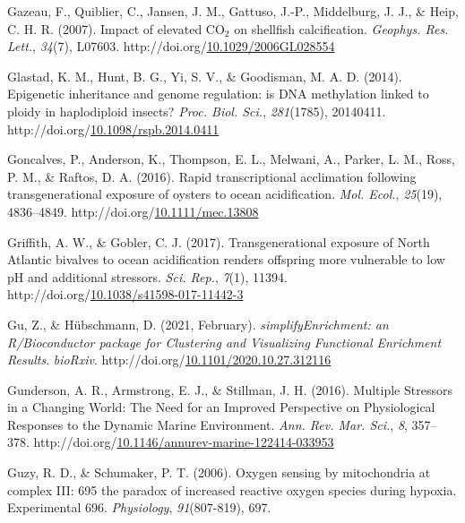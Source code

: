 \documentclass [11pt, proquest] {uwthesis}[2015/03/03]
\newlength{\cslhangindent}
\newenvironment{CSLReferences}%
{\setlength{\parindent}{0pt}%
\everypar{\setlength{\hangindent}{\cslhangindent}}\ignorespaces}%
{\par}
\begin{document}
\begin{CSLReferences}{1}{0}
\leavevmode\hypertarget{ref-Gazeau2007}{}%
Gazeau, F., Quiblier, C., Jansen, J. M., Gattuso, J.-P., Middelburg, J. J., \& Heip, C. H. R. (2007). {Impact of elevated {CO\(_2\)} on shellfish calcification}. \emph{Geophys. Res. Lett.}, \emph{34}(7), L07603. http://doi.org/\href{https://doi.org/10.1029/2006GL028554}{10.1029/2006GL028554}

\leavevmode\hypertarget{ref-Glastad2014}{}%
Glastad, K. M., Hunt, B. G., Yi, S. V., \& Goodisman, M. A. D. (2014). {Epigenetic inheritance and genome regulation: is DNA methylation linked to ploidy in haplodiploid insects?} \emph{Proc. Biol. Sci.}, \emph{281}(1785), 20140411. http://doi.org/\href{https://doi.org/10.1098/rspb.2014.0411}{10.1098/rspb.2014.0411}

\leavevmode\hypertarget{ref-Goncalves2016}{}%
Goncalves, P., Anderson, K., Thompson, E. L., Melwani, A., Parker, L. M., Ross, P. M., \& Raftos, D. A. (2016). {Rapid transcriptional acclimation following transgenerational exposure of oysters to ocean acidification}. \emph{Mol. Ecol.}, \emph{25}(19), 4836--4849. http://doi.org/\href{https://doi.org/10.1111/mec.13808}{10.1111/mec.13808}

\leavevmode\hypertarget{ref-Griffith2017}{}%
Griffith, A. W., \& Gobler, C. J. (2017). {Transgenerational exposure of North Atlantic bivalves to ocean acidification renders offspring more vulnerable to low pH and additional stressors}. \emph{Sci. Rep.}, \emph{7}(1), 11394. http://doi.org/\href{https://doi.org/10.1038/s41598-017-11442-3}{10.1038/s41598-017-11442-3}

\leavevmode\hypertarget{ref-Gu2021}{}%
Gu, Z., \& Hübschmann, D. (2021, February). \emph{{simplifyEnrichment: an R/Bioconductor package for Clustering and Visualizing Functional Enrichment Results}}. \emph{bioRxiv}. http://doi.org/\href{https://doi.org/10.1101/2020.10.27.312116}{10.1101/2020.10.27.312116}

\leavevmode\hypertarget{ref-Gunderson2016}{}%
Gunderson, A. R., Armstrong, E. J., \& Stillman, J. H. (2016). {Multiple Stressors in a Changing World: The Need for an Improved Perspective on Physiological Responses to the Dynamic Marine Environment}. \emph{Ann. Rev. Mar. Sci.}, \emph{8}, 357--378. http://doi.org/\href{https://doi.org/10.1146/annurev-marine-122414-033953}{10.1146/annurev-marine-122414-033953}

\leavevmode\hypertarget{ref-Guzy2006}{}%
Guzy, R. D., \& Schumaker, P. T. (2006). {Oxygen sensing by mitochondria at complex III: 695 the paradox of increased reactive oxygen species during hypoxia. Experimental 696}. \emph{Physiology}, \emph{91}(807-819), 697.


\end{CSLReferences}
\end{document}
